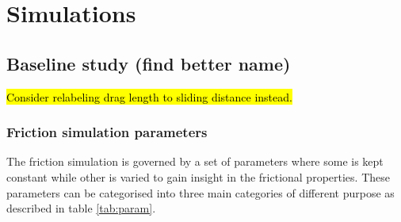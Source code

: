 \newpage
\chapter*{Simulations}



\section{Baseline study (find better name)}

\hl{Consider relabeling drag length to sliding distance instead.}

\subsection{Friction simulation parameters}

The friction simulation is governed by a set of parameters where some is kept constant while other is varied to gain insight in the frictional properties. These parameters can be categorised into three main categories of different purpose as described in table \ref{tab:param}. 


